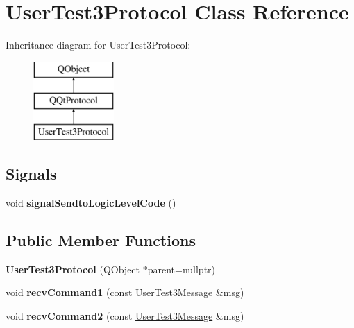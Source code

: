 \hypertarget{class_user_test3_protocol}{}\section{User\+Test3\+Protocol Class Reference}
\label{class_user_test3_protocol}
Inheritance diagram for User\+Test3\+Protocol\+:\begin{figure}[H]
\begin{center}
\leavevmode
\includegraphics[height=3.000000cm]{class_user_test3_protocol}
\end{center}
\end{figure}
\subsection*{Signals}
\begin{DoxyCompactItemize}
\item 
\mbox{\label{class_user_test3_protocol_a66d52ae01ab9442ca056d488f1e1c4d2}} 
void {\bfseries signal\+Sendto\+Logic\+Level\+Code} ()
\end{DoxyCompactItemize}
\subsection*{Public Member Functions}
\begin{DoxyCompactItemize}
\item 
\mbox{\label{class_user_test3_protocol_aae60afd66ca21b20140a35590000fc80}} 
{\bfseries User\+Test3\+Protocol} (Q\+Object $\ast$parent=nullptr)
\item 
\mbox{\label{class_user_test3_protocol_a8d2b7415589b4a6b192ce8e7dc43c045}} 
void {\bfseries recv\+Command1} (const \mbox{\hyperlink{class_user_test3_message}{User\+Test3\+Message}} \&msg)
\item 
\mbox{\label{class_user_test3_protocol_a31385986495bc45a667d272545d17c2f}} 
void {\bfseries recv\+Command2} (const \mbox{\hyperlink{class_user_test3_message}{User\+Test3\+Message}} \&msg)
\end{DoxyCompactItemize}
